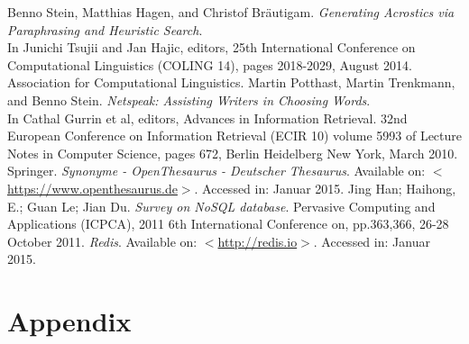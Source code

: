 \documentclass{reportAlternative}
\begin{document}
\begin{thebibliography}{1}
	Benno Stein, Matthias Hagen, and Christof Bräutigam. \emph{Generating Acrostics via Paraphrasing and Heuristic Search}. \\
	In Junichi Tsujii and Jan Hajic, editors, 25th International Conference on Computational Linguistics (COLING 14), pages 2018-2029, August 2014. Association for Computational Linguistics. 
	Martin Potthast, Martin Trenkmann, and Benno Stein.
	\emph{Netspeak: Assisting Writers in Choosing Words}. \\
	In Cathal Gurrin et al, editors, Advances in Information Retrieval. 32nd European Conference on Information Retrieval (ECIR 10) volume 5993 of Lecture Notes in Computer Science, pages 672, Berlin Heidelberg New York, March 2010. Springer.
	\emph{Synonyme - OpenThesaurus - Deutscher Thesaurus}.
	Available on: $<$\url{https://www.openthesaurus.de}$>$.
	Accessed in: Januar 2015.
	Jing Han; Haihong, E.; Guan Le; Jian Du. \emph{Survey on NoSQL database}. Pervasive Computing and Applications (ICPCA), 2011 6th International Conference on, pp.363,366, 26-28 October 2011.
	\emph{Redis}.
	Available on: $<$\url{http://redis.io}$>$.
	Accessed in: Januar 2015.
\end{thebibliography}

\appendix
\chapter{Appendix}
\end{document}
